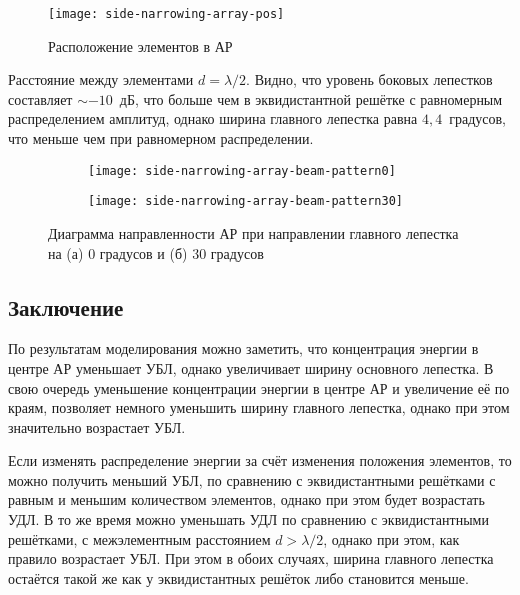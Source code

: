 \begin{figure}[!ht]
    \centering
    \texttt{[image: side-narrowing-array-pos]}
    \caption{Расположение элементов в АР}
    \label{fig:side-narrowing-array-pos}
\end{figure}


Расстояние между элементами $d=\lambda/2$. Видно, что уровень боковых лепестков составляет $\sim-10$~дБ, 
что больше чем в эквидистантной решётке с равномерным распределением амплитуд, 
однако ширина главного лепестка равна $4,4$~градусов, 
что меньше чем при равномерном распределении.

\begin{figure}[H]
    \centering
    \begin{subfigure}[b]{0.49\textwidth}
        \centering
        \hspace*{-3ex}
        \texttt{[image: side-narrowing-array-beam-pattern0]}
        \caption{}%
    \end{subfigure}
    \hfill
    \begin{subfigure}[b]{0.49\textwidth}
        \centering
        \hspace*{-3ex}
        \texttt{[image: side-narrowing-array-beam-pattern30]}
        \caption{}%
    \end{subfigure}
    \caption{%
    Диаграмма направленности АР при направлении главного лепестка на (а) 0 градусов и (б) 30 градусов
    }%
    \label{fig:side-narrowing-array-modeling}
\end{figure}



\subsection{Заключение}

По результатам моделирования можно заметить, что концентрация энергии в центре АР уменьшает УБЛ, однако 
увеличивает ширину основного лепестка. В свою очередь уменьшение концентрации энергии в центре АР и увеличение её 
по краям, позволяет немного уменьшить ширину главного лепестка, однако при этом значительно возрастает УБЛ.

Если изменять распределение энергии за счёт изменения положения элементов, то можно получить меньший УБЛ, по 
сравнению с эквидистантными решётками с равным и меньшим количеством элементов, однако при этом будет 
возрастать УДЛ. В то же время можно уменьшать УДЛ по сравнению с эквидистантными решётками, с 
межэлементным расстоянием $d>\lambda/2$, однако при этом, как правило возрастает УБЛ. При этом в обоих случаях, 
ширина главного лепестка остаётся такой же как у эквидистантных решёток либо становится меньше.

